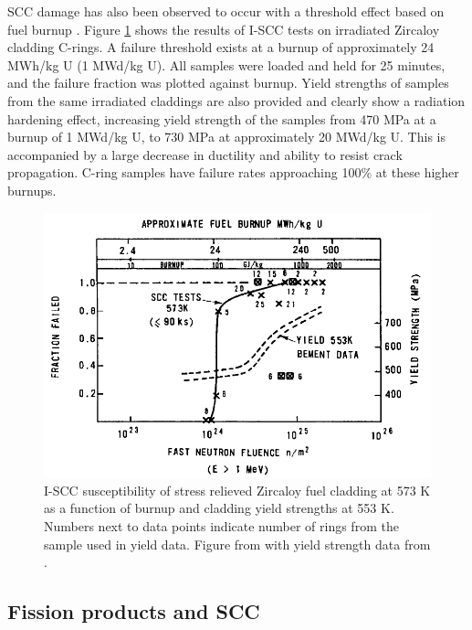 SCC damage has also been observed to occur with a threshold effect based on fuel burnup \cite{Wood1974}. Figure \ref{figure:SCCthreshold} shows the results of I-SCC tests on irradiated Zircaloy cladding C-rings. A failure threshold exists at a burnup of approximately 24 MWh/kg U (1 MWd/kg U). All samples were loaded and held for 25 minutes, and the failure fraction was plotted against burnup. Yield strengths of samples from the same irradiated claddings are also provided and clearly show a radiation hardening effect, increasing yield strength of the samples from 470 MPa at a burnup of 1 MWd/kg U, to 730 MPa at approximately 20 MWd/kg U. This is accompanied by a large decrease in ductility and ability to resist crack propagation. C-ring samples have failure rates approaching 100\% at these higher burnups.

\begin{figure}[ht] %
\centering
\includegraphics[width=14cm]{images/SCCthreshold.png}
\caption[I-SCC susceptibility of stress relieved Zircaloy fuel cladding at 573 K as a function of burnup and cladding yield strengths at 553 K. Numbers next to data points indicate number of rings from the sample used in yield data.]{I-SCC susceptibility of stress relieved Zircaloy fuel cladding at 573 K as a function of burnup and cladding yield strengths at 553 K. Numbers next to data points indicate number of rings from the sample used in yield data. Figure from \cite{bcoxpelletclad1990} with yield strength data from \cite{Bement1964}.}
\label{figure:SCCthreshold}
\end{figure}

\subsection{Fission products and SCC}

